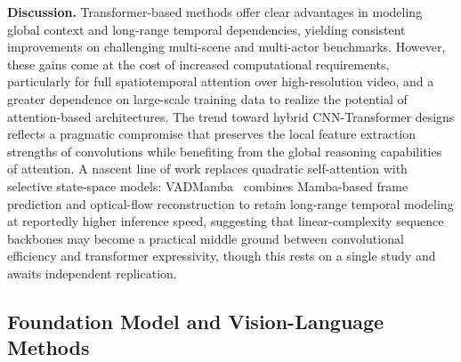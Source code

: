 \documentclass[10pt,a4paper]{article}
\renewcommand{\arraystretch}{1.12}
\begin{document}
\begin{table}[!t]
\centering
\caption{Comparison of representative transformer-based methods for video anomaly detection. AUC (\%) is reported at the frame level.}
\label{tab:transformer_methods}
\renewcommand{\arraystretch}{1.25}
\end{table}


\textbf{Discussion.} Transformer-based methods offer clear advantages in modeling global context and long-range temporal dependencies, yielding consistent improvements on challenging multi-scene and multi-actor benchmarks. However, these gains come at the cost of increased computational requirements, particularly for full spatiotemporal attention over high-resolution video, and a greater dependence on large-scale training data to realize the potential of attention-based architectures. The trend toward hybrid CNN-Transformer designs reflects a pragmatic compromise that preserves the local feature extraction strengths of convolutions while benefiting from the global reasoning capabilities of attention. A nascent line of work replaces quadratic self-attention with selective state-space models: VADMamba~\citep{lyu2025vadmamba} combines Mamba-based frame prediction and optical-flow reconstruction to retain long-range temporal modeling at reportedly higher inference speed, suggesting that linear-complexity sequence backbones may become a practical middle ground between convolutional efficiency and transformer expressivity, though this rests on a single study and awaits independent replication.


\subsection{Foundation Model and Vision-Language Methods}
\label{subsec:foundation_models}
\end{document}
